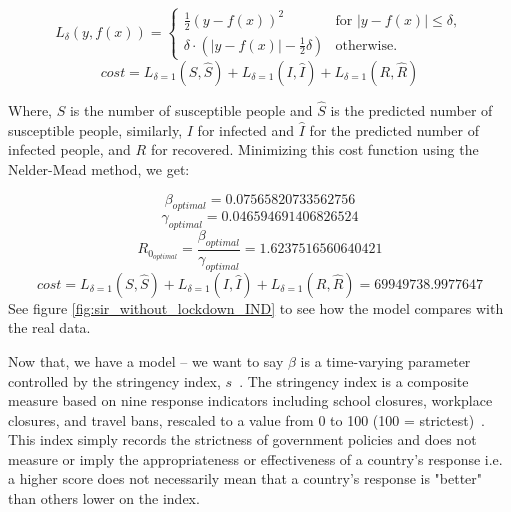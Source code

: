 \documentclass[tikz,fleqn,12pt]{wlscirep}
\begin{document}
\begin{equation}
  L_{\delta}(y, f(x)) = 
  \begin{cases}
    \frac{1}{2}{(y - f(x))^2} & \text{for } |y - f(x)| \leq \delta, \\
    \delta \cdot (|y - f(x)| - \frac{1}{2}\delta) & \text{otherwise.}
  \label{eq:huberloss}
  \end{cases}
\end{equation}
\begin{equation}
  cost = L_{\delta = 1}(S, \hat{S}) + L_{\delta = 1}(I, \hat{I}) + L_{\delta = 1}(R, \hat{R})
  \label{eq:cost_SIR_model}
\end{equation}

Where, $S$ is the number of susceptible people and $\hat{S}$ is the predicted number of susceptible people, similarly, $I$ for infected and $\hat{I}$ for the predicted number of infected people, and $R$ for recovered. Minimizing this cost function using the Nelder-Mead method\cite{Gao2010}, we get:

\begin{equation}
  \beta_{optimal} = 0.07565820733562756
  \label{eq:beta_optimal_without_lockdown}
\end{equation}
\begin{equation}
  \gamma_{optimal} = 0.046594691406826524
  \label{eq:gamma_optimal_without_lockdown}
\end{equation}
\begin{equation}
  R_{0_{optimal}} = \frac{\beta_{optimal}}{\gamma_{optimal}} = 1.6237516560640421
  \label{eq:r0_without_lockdown}
\end{equation}
\begin{equation}
  cost = L_{\delta = 1}(S, \hat{S}) + L_{\delta = 1}(I, \hat{I}) + L_{\delta = 1}(R, \hat{R}) = 69949738.9977647
  \label{eq:cost_without_lockdown}
\end{equation}
See figure \ref{fig:sir_without_lockdown_IND} to see how the model compares with the real data.

Now that, we have a model -- we want to say $\beta$ is a time-varying parameter controlled by the stringency index, $s$~\cite{SIRLockdown,SIRLockdown2,analytical_covid_lockdown_model}. The stringency index is a composite measure based on nine response indicators including school closures, workplace closures, and travel bans, rescaled to a value from 0 to 100 (100 = strictest)~\cite{owidcoronavirus}. This index simply records the strictness of government policies and does not measure or imply the appropriateness or effectiveness of a country's response i.e. a higher score does not necessarily mean that a country's response is "better" than others lower on the index. 
\end{document}
